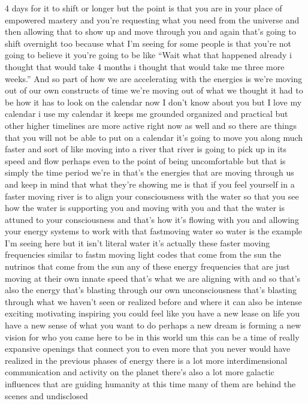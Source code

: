 \documentclass{article}
\begin{document}
4 days for it to shift or longer but the point is that you are in your
place of empowered mastery and you're requesting what you need from the
universe and then allowing that to show up and move through you and
again that's going to shift overnight too because what I'm seeing for
some people is that you're not going to believe it you're going to be
like ``Wait what that happened already i thought that would take 4
months i thought that would take me three more weeks.'' And so part of
how we are accelerating with the energies is we're moving out of our own
constructs of time we're moving out of what we thought it had to be how
it has to look on the calendar now I don't know about you but I love my
calendar i use my calendar it keeps me grounded organized and practical
but other higher timelines are more active right now as well and so
there are things that you will not be able to put on a calendar it's
going to move you along much faster and sort of like moving into a river
that river is going to pick up in its speed and flow perhaps even to the
point of being uncomfortable but that is simply the time period we're in
that's the energies that are moving through us and keep in mind that
what they're showing me is that if you feel yourself in a faster moving
river is to align your consciousness with the water so that you see how
the water is supporting you and moving with you and that the water is
attuned to your consciousness and that's how it's flowing with you and
allowing your energy systems to work with that fastmoving water so water
is the example I'm seeing here but it isn't literal water it's actually
these faster moving frequencies similar to fastm moving light codes that
come from the sun the nutrinos that come from the sun any of these
energy frequencies that are just moving at their own innate speed that's
what we are aligning with and so that's also the energy that's blasting
through our own unconsciousness that's blasting through what we haven't
seen or realized before and where it can also be intense exciting
motivating inspiring you could feel like you have a new lease on life
you have a new sense of what you want to do perhaps a new dream is
forming a new vision for who you came here to be in this world um this
can be a time of really expansive openings that connect you to even more
that you never would have realized in the previous phases of energy
there is a lot more interdimensional communication and activity on the
planet there's also a lot more galactic influences that are guiding
humanity at this time many of them are behind the scenes and undisclosed
\end{document}
